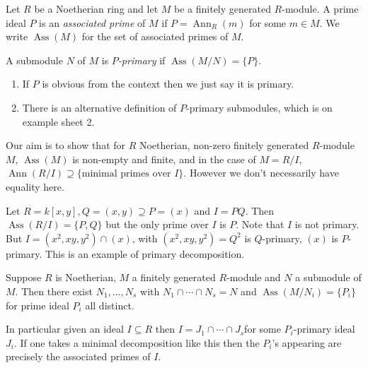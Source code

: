 \documentclass[a4paper]{article}
\DeclareMathOperator{\Ann}{Ann} %
\DeclareMathOperator{\Ass}{Ass} %
\begin{document}
\begin{definition}
  Let \(R\) be a Noetherian ring and let \(M\) be a finitely generated \(R\)-module. A prime ideal \(P\) is an \emph{associated prime} of \(M\) if \(P = \Ann_R(m)\) for some \(m \in M\). We write \(\Ass(M)\) for the set of associated primes of \(M\).
\end{definition}

\begin{definition}
  A submodule \(N\) of \(M\) is \emph{\(P\)-primary} if \(\Ass(M/N) = \{P\}\).
\end{definition}

\begin{remark}\leavevmode
  \begin{enumerate}
  \item If \(P\) is obvious from the context then we just say it is primary.
  \item There is an alternative definition of \(P\)-primary submodules, which is on example sheet 2.
  \end{enumerate}
\end{remark}

Our aim is to show that for \(R\) Noetherian, non-zero finitely generated \(R\)-module \(M\), \(\Ass(M)\) is non-empty and finite, and in the case of \(M = R/I\), \(\Ann(R/I) \supseteq \{\text{minimal primes over } I\}\). However we don't necessarily have equality here.

\begin{eg}
  Let \(R = k[x, y], Q = (x, y) \supseteq P = (x)\) and \(I = PQ\). Then \(\Ass(R/I) = \{P, Q\}\) but the only prime over \(I\) is \(P\). Note that \(I\) is not primary. But \(I = (x^2, xy, y^2) \cap (x)\), with \((x^2, xy, y^2) = Q^2\) is \(Q\)-primary, \((x)\) is \(P\)-primary. This is an example of primary decomposition.
\end{eg}

\begin{theorem}
  Suppose \(R\) is Noetherian, \(M\) a finitely generated \(R\)-module and \(N\) a submodule of \(M\). Then there exist \(N_1, \dots, N_s\) with \(N_1 \cap \cdots \cap N_s = N\) and \(\Ass(M/N_i) = \{P_i\}\) for prime ideal \(P_i\) all distinct.

  In particular given an ideal \(I \subseteq R\) then \(I = J_1 \cap \cdots \cap J_s\)for some \(P_i\)-primary ideal \(J_i\). If one takes a minimal decomposition like this then the \(P_i\)'s appearing are precisely the associated primes of \(I\).
\end{theorem}
\end{document}
